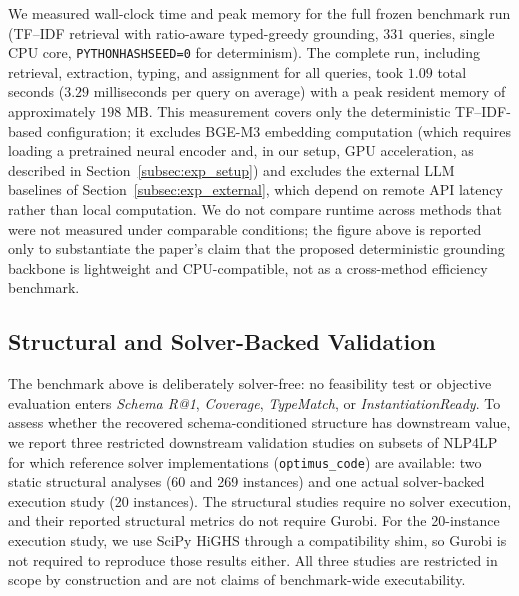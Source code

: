 \documentclass[3p]{elsarticle}
\begin{document}
We measured wall-clock time and peak memory for the full frozen benchmark run (TF--IDF retrieval with ratio-aware typed-greedy grounding, $331$ queries, single CPU core, \texttt{PYTHONHASHSEED=0} for determinism). The complete run, including retrieval, extraction, typing, and assignment for all queries, took $1.09$ total seconds ($3.29$ milliseconds per query on average) with a peak resident memory of approximately $198$ MB. This measurement covers only the deterministic TF--IDF-based configuration; it excludes BGE-M3 embedding computation (which requires loading a pretrained neural encoder and, in our setup, GPU acceleration, as described in Section~\ref{subsec:exp_setup}) and excludes the external LLM baselines of Section~\ref{subsec:exp_external}, which depend on remote API latency rather than local computation. We do not compare runtime across methods that were not measured under comparable conditions; the figure above is reported only to substantiate the paper's claim that the proposed deterministic grounding backbone is lightweight and CPU-compatible, not as a cross-method efficiency benchmark.

\subsection{Structural and Solver-Backed Validation}
\label{subsec:exp_engineering}

The benchmark above is deliberately solver-free: no feasibility test or objective evaluation enters \textit{Schema R@1}, \textit{Coverage}, \textit{TypeMatch}, or \textit{InstantiationReady}. To assess whether the recovered schema-conditioned structure has downstream value, we report three restricted downstream validation studies on subsets of \textsc{NLP4LP} for which reference solver implementations (\texttt{optimus\_code}) are available: two static structural analyses (60 and 269 instances) and one actual solver-backed execution study (20 instances). The structural studies require no solver execution, and their reported structural metrics do not require Gurobi. For the 20-instance execution study, we use SciPy HiGHS through a compatibility shim, so Gurobi is not required to reproduce those results either. All three studies are restricted in scope by construction and are not claims of benchmark-wide executability.
\end{document}

